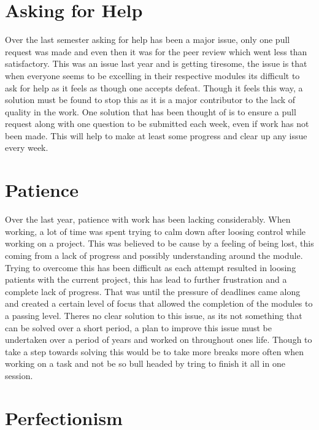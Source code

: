 \documentclass{scrartcl}
\begin{document}
\section{Asking for Help}

Over the last semester asking for help has been a major issue, only one pull request was made and even then it was for the peer review which went less than satisfactory. This was an issue last year and is getting tiresome, the issue is that when everyone seems to be excelling in their respective modules its difficult to ask for help as it feels as though one accepts defeat. Though it feels this way, a solution must be found to stop this as it is a major contributor to the lack of quality in the work. One solution that has been thought of is to ensure a pull request along with one question to be submitted each week, even if work has not been made. This will help to make at least some progress and clear up any issue every week.

\section{Patience}

Over the last year, patience with work has been lacking considerably. When working, a lot of time was spent trying to calm down after loosing control while working on a project. This was believed to be cause by a feeling of being lost, this coming from a lack of progress and possibly understanding around the module. Trying to overcome this has been difficult as each attempt resulted in loosing patients with the current project, this has lead to further frustration and a complete lack of progress. That was until the pressure of deadlines came along and created a certain level of focus that allowed the completion of the modules to a passing level. Theres no clear solution to this issue, as its not something that can be solved over a short period, a plan to improve this issue must be undertaken over a period of years and worked on throughout ones life. Though to take a step towards solving this would be to take more breaks more often when working on a task and not be so bull headed by tring to finish it all in one session.

\section{Perfectionism}
\end{document}
